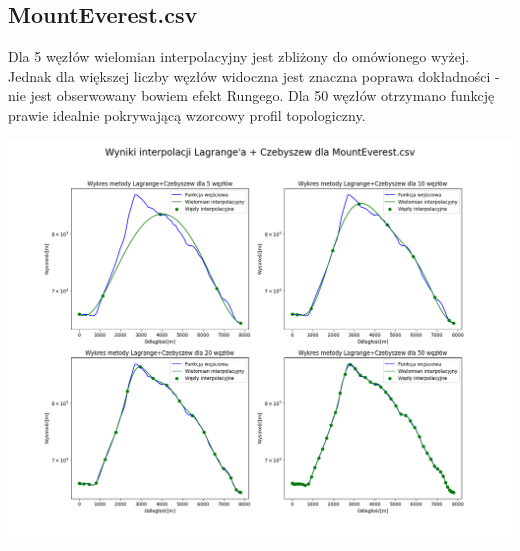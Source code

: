 \documentclass[a4paper,12pt]{article}
\begin{document}
	\subsection{MountEverest.csv}
	Dla 5 węzłów wielomian interpolacyjny jest zbliżony do omówionego wyżej. Jednak dla większej liczby węzłów widoczna jest znaczna poprawa dokładności - nie jest obserwowany bowiem efekt Rungego. Dla 50 węzłów otrzymano funkcję prawie idealnie pokrywającą wzorcowy profil topologiczny.
	\begin{center}
        \includegraphics[scale=0.4]{../charts/chebyshev_MountEverest.png}
    \end{center}
    
    \newpage
\end{document}
